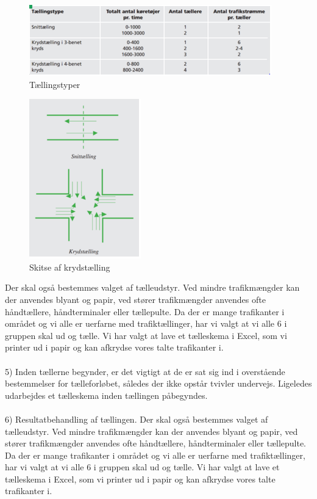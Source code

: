 \begin{figure}[htbp]
   \label{fig:taellingstype}
   \centering
   \begin{adjustbox}{max width=\textwidth}
     \includegraphics[scale=1]{billederogfigur/taellingstype.jpg}
  \end{adjustbox}
   \caption{Tællingstyper}
 \end{figure}
 
 \begin{figure}[htbp]
   \label{fig:krydstaelling}
   \centering
   \begin{adjustbox}{max width=\textwidth}
     \includegraphics[scale=1]{billederogfigur/krydstaelling.jpg}
  \end{adjustbox}
   \caption{Skitse af krydstælling}
 \end{figure}
 
Der skal også bestemmes valget af tælleudstyr. Ved mindre trafikmængder kan der anvendes blyant og papir, ved stører trafikmængder anvendes ofte håndtællere, håndterminaler eller tællepulte. Da der er mange trafikanter i området og vi alle er uerfarne med trafiktællinger, har vi valgt at vi alle 6 i gruppen skal ud og tælle. Vi har valgt at lave et tælleskema i Excel, som vi printer ud i papir og kan afkrydse vores talte trafikanter i.
\\\\
5) Inden tællerne begynder, er det vigtigt at de er sat sig ind i overstående bestemmelser for tælleforløbet, således der ikke opstår tvivler undervejs. Ligeledes udarbejdes et tælleskema inden tællingen påbegyndes. 
\\\\
6) Resultatbehandling af tællingen. 
Der skal også bestemmes valget af tælleudstyr. Ved mindre trafikmængder kan der anvendes blyant og papir, ved stører trafikmængder anvendes ofte håndtællere, håndterminaler eller tællepulte.
Da der er mange trafikanter i området og vi alle er uerfarne med trafiktællinger, har vi valgt at vi alle 6 i gruppen skal ud og tælle. Vi har valgt at lave et tælleskema i Excel, som vi printer ud i papir og kan afkrydse vores talte trafikanter i.
 
